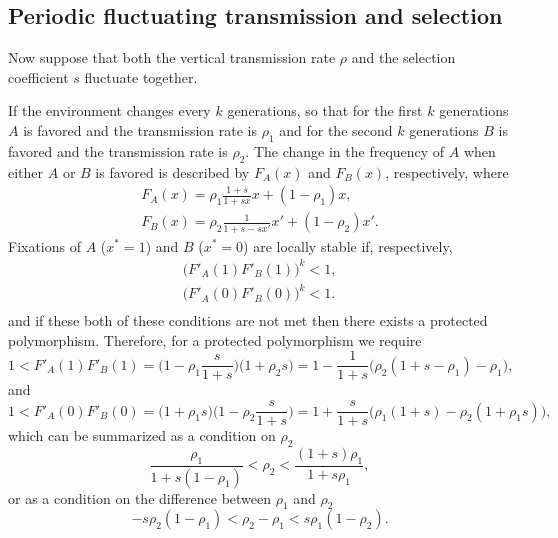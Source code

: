 \documentclass[12pt]{extarticle} %
\begin{document}
\subsection*{Periodic fluctuating transmission and selection}

Now suppose that both the vertical transmission rate $\rho$ and the selection coefficient $s$ fluctuate together.

If the environment changes every $k$ generations, so that for the first $k$ generations $A$ is favored and the transmission rate is $\rho_1$ and for the second $k$ generations $B$ is favored and the transmission rate is $\rho_2$.
The change in the frequency of $A$ when either $A$ or $B$ is favored is described by $F_A(x)$ and $F_B(x)$, respectively, where
\begin{equation}\begin{aligned} \label{eq:recurrence_periodic_fluc}
F_A(x) = \rho_1 \frac{1+s}{1+sx} x + (1-\rho_1)x, \\
F_B(x) = \rho_2 \frac{1}{1+s-sx'} x' + (1-\rho_2)x'.
\end{aligned}\end{equation}
Fixations of $A$ ($x^*=1$) and $B$ ($x^*=0$) are locally stable if, respectively,
\begin{equation}\begin{aligned}
\big(F'_A(1) F'_B(1)\big)^k < 1, \\
\big(F'_A(0) F'_B(0)\big)^k < 1. \\
\end{aligned}\end{equation}
and if these both of these conditions are not met then there exists a protected polymorphism.
Therefore, for a protected polymorphism we require
\begin{equation}
1 < F'_A(1) F'_B(1) = \big(1-\rho_1\frac{s}{1+s}\big)\big(1+\rho_2 s\big) 
= 1-\frac{1}{1+s}\big(\rho_2(1+s-\rho_1)-\rho_1\big),
\end{equation}
and
\begin{equation}
1 < F'_A(0) F'_B(0) = \big(1+\rho_1 s\big)\big(1-\rho_2 \frac{s}{1+s}\big) 
= 1+\frac{s}{1+s}\big(\rho_1(1+s) -\rho_2(1+\rho_1 s)\big),
\end{equation}
which can be summarized as a condition on $\rho_2$
\begin{equation} \label{eq:poly_condition_periodic_fluc}
\frac{\rho_1}{1+s(1-\rho_1)} < \rho_2 < \frac{(1+s)\rho_1}{1+s\rho_1},
\end{equation}
or as a condition on the difference between $\rho_1$ and $\rho_2$
\begin{equation}
-s\rho_2(1-\rho_1) < \rho_2 - \rho_1 < s\rho_1(1-\rho_2).
\end{equation}
\end{document}
